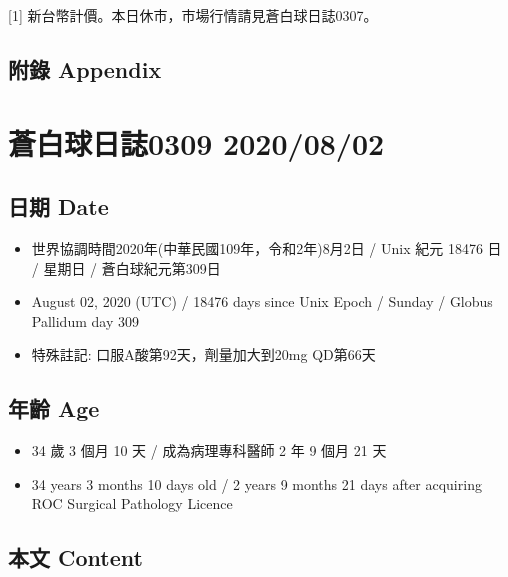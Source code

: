\documentclass[a5paper, 11pt
]{book}
\providecommand{\tightlist}{%
  \setlength{\itemsep}{0pt}\setlength{\parskip}{0pt}}
\begin{document}
{[}1{]} 新台幣計價。本日休市，市場行情請見蒼白球日誌0307。

\hypertarget{ux9644ux9304-appendix-53}{%
\subsection{附錄 Appendix}\label{ux9644ux9304-appendix-53}}

\hypertarget{ux84bcux767dux7403ux65e5ux8a8c0309-20200802}{%
\section{蒼白球日誌0309
2020/08/02}\label{ux84bcux767dux7403ux65e5ux8a8c0309-20200802}}

\hypertarget{ux65e5ux671f-date-54}{%
\subsection{日期 Date}\label{ux65e5ux671f-date-54}}

\begin{itemize}
\tightlist
\item
  世界協調時間2020年(中華民國109年，令和2年)8月2日 / Unix 紀元 18476 日
  / 星期日 / 蒼白球紀元第309日
\item
  August 02, 2020 (UTC) / 18476 days since Unix Epoch / Sunday / Globus
  Pallidum day 309
\item
  特殊註記: 口服A酸第92天，劑量加大到20mg QD第66天
\end{itemize}

\hypertarget{ux5e74ux9f61-age-54}{%
\subsection{年齡 Age}\label{ux5e74ux9f61-age-54}}

\begin{itemize}
\tightlist
\item
  34 歲 3 個月 10 天 / 成為病理專科醫師 2 年 9 個月 21 天
\item
  34 years 3 months 10 days old / 2 years 9 months 21 days after
  acquiring ROC Surgical Pathology Licence
\end{itemize}

\hypertarget{ux672cux6587-content-54}{%
\subsection{本文 Content}\label{ux672cux6587-content-54}}
\end{document}
